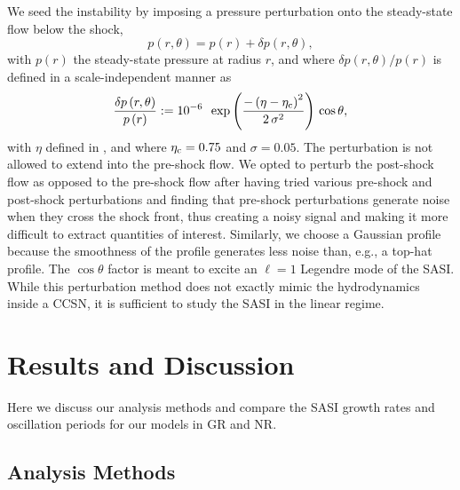 We seed the instability by imposing a pressure perturbation onto the
steady-state flow below the shock,
\begin{equation}
  p\left(r,\theta\right)
  =p\left(r\right)+\delta p\left(r,\theta\right),
\end{equation}
with $p\left(r\right)$ the steady-state pressure at radius $r$,
and where $\delta p\left(r,\theta\right)/p\left(r\right)$ is defined in a
scale-independent manner as
\begin{equation}
  \frac{\delta p\left(r,\theta\right)}{p\left(r\right)}
  :=10^{-6}\,\
  \exp\left(\frac{-\left(\eta-\eta_{\mathrm{c}}\right)^{2}}{2\,\sigma^{2}}\right)\,
  \cos\theta,
\end{equation}
with $\eta$ defined in ,
and where $\eta_{\mathrm{c}}=0.75$ and $\sigma=0.05$.
The perturbation is not allowed to extend into the pre-shock flow.
We opted to perturb the post-shock flow as opposed to
the pre-shock flow
after having tried various pre-shock and post-shock perturbations
and finding that pre-shock perturbations generate noise when
they cross the shock front, thus creating a noisy signal and making
it more difficult to extract quantities of interest.
Similarly, we choose a Gaussian profile
because the smoothness of the profile generates less noise than, e.g.,
a top-hat profile.
The $\cos\theta$ factor is meant to excite an $\ell=1$ Legendre mode
of the SASI.
While this perturbation method does not exactly mimic the hydrodynamics
inside a CCSN, it is sufficient to study the SASI
in the linear regime.

\section{Results and Discussion}
\label{sec.results}

Here we discuss our analysis methods and compare the SASI growth
rates and oscillation periods for our \nModels{} models in GR and NR.

\subsection{Analysis Methods}

